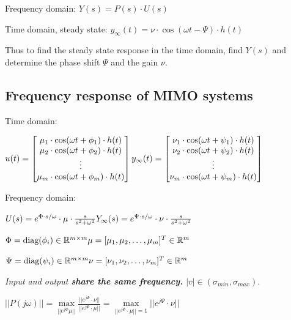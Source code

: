 \documentclass[10pt,a4paper]{scrartcl}
\begin{document}
\begin{multicols*}{3}
	Frequency domain: $Y(s)=P(s)\cdot U(s)$
	
	Time domain, steady state: $y_\infty(t)=\nu\cdot \cos(\omega t-\Psi)\cdot h(t)$
	
	Thus to find the steady state response in the time domain, find $Y(s)$ and determine the phase shift $\Psi$ and the gain $\nu$.
	
	\subsection{Frequency response of MIMO systems}
	
	Time domain:
	
	\footnotesize
	$u(t)=\begin{bmatrix}\mu_1\cdot \cos(\omega t+\phi_1)\cdot h(t)\\
	\mu_2\cdot \cos(\omega t+\phi_2)\cdot h(t)\\
	\vdots\\
	\mu_m\cdot \cos(\omega t+\phi_m)\cdot h(t)\end{bmatrix}\hfill y_\infty(t)=\begin{bmatrix}\nu_1\cdot \cos(\omega t+\psi_1)\cdot h(t)\\
	\nu_2\cdot\cos(\omega t+\psi_2)\cdot h(t)\\
	\vdots\\
	\nu_m\cdot\cos(\omega t+\psi_m)\cdot h(t)\end{bmatrix}$
	\normalsize
	
	\finn
	
	Frequency domain:
	
	$U(s)=e^{\Phi\cdot s/\omega}\cdot\mu\cdot\frac{s}{s^2+\omega^2}\hfill Y_\infty(s)=e^{\Psi\cdot s/\omega}\cdot\nu\cdot\frac{s}{s^2+\omega^2}$
	
	\finn
	
	$\Phi=\text{diag}(\phi_i)\in\mathbb{R}^{m\times m}\hfill \mu=[\mu_1,\mu_2,\ldots,\mu_m]^T\in\mathbb{R}^m$
	
	$\Psi=\text{diag}(\psi_i)\in\mathbb{R}^{m\times m}\hfill \nu=[\nu_1,\nu_2,\ldots,\nu_m]^T\in\mathbb{R}^m$
	

	\small
	\emph{Input and output \textbf{share the same frequency.} $|v|\in (\sigma_{min},\sigma_{max}).$}
	\normalsize

	\finn	
	
	$||P(j\omega)||=\max\limits_{||e^{j\Phi}\mu||}\frac{||e^{j\Psi}\cdot\nu||}{||e^{j\Phi}\cdot\mu||}=\max\limits_{||e^{j\Phi}\cdot\mu||=1}||e^{j\Psi}\cdot\nu||$
	

\end{multicols*}
\end{document}

